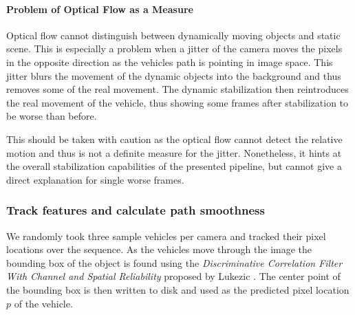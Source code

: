 

\paragraph{Problem of Optical Flow as a Measure}
\label{sec:dynamic_stabilization_evaluation_optical_flow_problem}
Optical flow cannot distinguish between dynamically moving objects and static scene.
This is especially a problem when a jitter of the camera moves the pixels in the opposite direction as the vehicles path is pointing in image space.
This jitter blurs the movement of the dynamic objects into the background and thus removes some of the real movement.
The dynamic stabilization then reintroduces the real movement of the vehicle, thus showing some frames after stabilization to be worse than before. 

This should be taken with caution as the optical flow cannot detect the relative motion and thus is not a definite measure for the jitter.
Nonetheless, it hints at the overall stabilization capabilities of the presented pipeline, but cannot give a direct explanation for single worse frames.



\subsubsection{Track features and calculate path smoothness}
We randomly took three sample vehicles per camera and tracked their pixel locations over the sequence.
As the vehicles move through the image the bounding box of the object is found using the \emph{Discriminative Correlation Filter With Channel and Spatial Reliability} proposed by Lukezic \etal{} \cite{Lukezic_2017_CVPR,opencv_library}.
The center point of the bounding box is then written to disk and used as the predicted pixel location $p$ of the vehicle.

